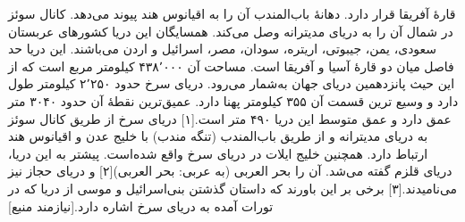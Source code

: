 \documentclass[a4paper,12pt,oneside,final]{article}
\begin{document}
 قارهٔ آفریقا قرار دارد. دهانهٔ باب‌المندب آن را به اقیانوس هند پیوند می‌دهد. کانال سوئز در شمال آن را به دریای مدیترانه وصل می‌کند. همسایگان این دریا کشورهای عربستان سعودی، یمن، جیبوتی، اریتره، سودان، مصر، اسرائیل و اردن می‌باشند. این دریا حد فاصل میان دو قارهٔ آسیا و آفریقا است.
مساحت آن ۴۳۸٬۰۰۰ کیلومتر مربع است که از این حیث پانزدهمین دریای جهان به‌شمار می‌رود. دریای سرخ حدود ۲٬۲۵۰ کیلومتر طول دارد و وسیع ترین قسمت آن ۳۵۵ کیلومتر پهنا دارد. عمیق‌ترین نقطهٔ آن حدود ۳۰۴۰ متر عمق دارد و عمق متوسط این دریا ۴۹۰ متر است.[۱] دریای سرخ از طریق کانال سوئز به دریای مدیترانه و از طریق باب‌المندب (تنگه مندب) با خلیج عدن و اقیانوس هند ارتباط دارد. همچنین خلیج ایلات در دریای سرخ واقع شده‌است.
پیشتر به این دریا، دریای قلزم گفته می‌شد. آن را بحر العربی (به عربی: بحر العربی)[۲] و دریای حجاز نیز می‌نامیدند.[۳] برخی بر این باورند که داستان گذشتن بنی‌اسرائیل و موسی از دریا که در تورات آمده به دریای سرخ اشاره دارد.[نیازمند منبع]
\end{document}
